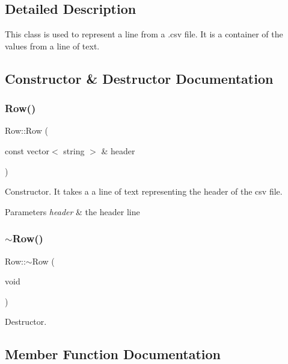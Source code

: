 \subsection{Detailed Description}
This class is used to represent a line from a .csv file. It is a container of the values from a line of text. 

\subsection{Constructor \& Destructor Documentation}
\mbox{\label{class_row_afc5afcd4b8560ddd3b7372df2bc063a8}} 
\subsubsection{\texorpdfstring{Row()}{Row()}}
{\footnotesize\ttfamily Row\+::\+Row (\begin{DoxyParamCaption}\item[{const vector$<$ string $>$ \&}]{header }\end{DoxyParamCaption})}

Constructor. It takes a a line of text representing the header of the csv file. 
\begin{DoxyParams}{Parameters}
{\em header} & the header line \\
\hline
\end{DoxyParams}
\mbox{\label{class_row_a671be9f718722eccb2d3121f1579733e}} 
\subsubsection{\texorpdfstring{$\sim$Row()}{~Row()}}
{\footnotesize\ttfamily Row\+::$\sim$\+Row (\begin{DoxyParamCaption}\item[{void}]{ }\end{DoxyParamCaption})}

Destructor. 

\subsection{Member Function Documentation}
\mbox{\label{class_row_a06931bff452df5a451da2268423bb6ea}} 
